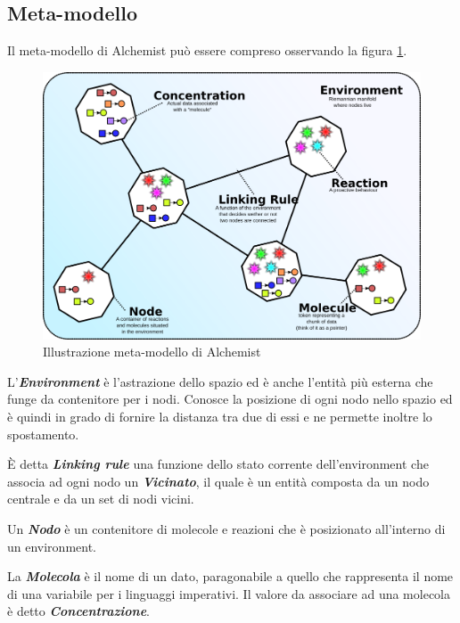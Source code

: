 \subsection{Meta-modello}
Il meta-modello di Alchemist può essere compreso osservando la figura \ref{fig:alchemistModel}.
\begin{figure}[h] %
\begin{center} %
\includegraphics[width=12.5cm]{images/AlchemistModel.png} %
\caption[Illustrazione meta-modello di Alchemist]{Illustrazione meta-modello di Alchemist} \label{fig:alchemistModel}
\end{center}
\end{figure}

L'\textbf{\textit{Environment}} è l'astrazione dello spazio ed è anche l'entità più esterna che funge da contenitore per i nodi. Conosce la posizione di ogni nodo nello spazio ed è quindi in grado di fornire la distanza tra due di essi e ne permette inoltre lo spostamento.

\`E detta \textbf{\textit{Linking rule}} una funzione dello stato corrente dell'environment che associa ad ogni nodo un \textbf{\textit{Vicinato}}, il quale è un entità composta da un nodo centrale e da un set di nodi vicini.

Un \textbf{\textit{Nodo}} è un contenitore di molecole e reazioni che è posizionato all'interno di un environment.

La \textbf{\textit{Molecola}} è il nome di un dato, paragonabile a quello che rappresenta il nome di una variabile per i linguaggi imperativi.
Il valore da associare ad una molecola è detto \textbf{\textit{Concentrazione}}.

